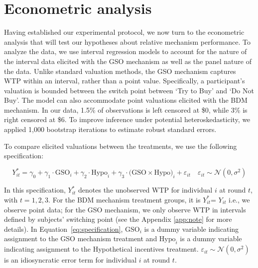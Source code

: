 \documentclass[12pt]{article}
\begin{document}


\section{Econometric analysis}
\label{Econometric}
Having established our experimental protocol, we now turn to the econometric analysis that will test our hypotheses about relative mechanism performance. To analyze the data, we use interval regression models to account for the nature of the interval data elicited with the GSO mechanism as well as the panel nature of the data. Unlike standard valuation methods, the GSO mechanism captures WTP within an interval, rather than a point value. Specifically, a participant's valuation is bounded between the switch point between `Try to Buy' and `Do Not Buy'. The model can also accommodate point valuations elicited with the BDM mechanism. In our data, 1.5\% of observations is left censored at \$0, while 3\% is right censored at \$6. To improve inference under potential heteroskedasticity, we applied 1,000 bootstrap iterations to estimate robust standard errors.

To compare elicited valuations between the treatments, we use the following specification:
\vspace{-1cm}

\begin{equation}\label{eq:specification}
Y_{it}^* = \gamma_0 + \gamma_1 \cdot \text{GSO}_i + \gamma_2 \cdot \text{Hypo}_i + \gamma_3 \cdot \text{(GSO} \times \text{Hypo)}_i +  \varepsilon_{it} 
\quad \varepsilon_{it} \sim \mathcal{N}(0, \sigma^2)
\end{equation}


In this specification, $Y_{it}^*$ denotes the unobserved WTP for individual $i$ at round $t$, with $t = 1, 2, 3$. For the BDM mechanism treatment groups, it is  $Y_{it}^*$= $Y_{it}$ i.e., we observe point data; for the GSO mechanism, we only observe WTP in intervals defined by subjects' switching point (see the Appendix \ref{app:note} for more details). In Equation~\ref{eq:specification}, $\text{GSO}_i$ is a dummy variable indicating assignment to the GSO mechanism treatment and $\text{Hypo}_i$ is a dummy variable indicating assignment to the Hypothetical incentives treatment. $\varepsilon_{it} \sim \mathcal{N}(0, \sigma^2)$ is an idiosyncratic error term for individual $i$ at round $t$.
\end{document}
